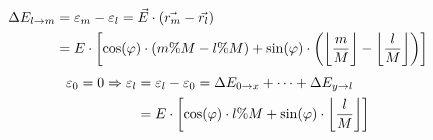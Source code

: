 \begin{equation}
    \label{eq:energy-difference-hopping}
    \begin{split}
        \Delta E_{l \rightarrow m} &=  \epsl[m] - \epsl[l] = \vec{E} \cdot \left(\vec{r_m}-\vec{r_l}\right)\\
        &= E \cdot \left[\cos(\varphi)\cdot \left(m \% M-l \% M\right) + \sin(\varphi)\cdot \left(\floor[\bigg]{\frac{m}{M}}-\floor[\bigg]{\frac{l}{M}}\right)\right]
    \end{split}
\end{equation}
\vspace{0.5cm} %
\begin{equation}
    \label{eq:epsl}
    \begin{split}
        \epsl[0] = 0 \Rightarrow
        \epsl[l] &= \epsl[l] - \epsl[0] = \Delta E_{0 \rightarrow x} + \dots + \Delta E_{y \rightarrow l}\\
        &= E \cdot \left[\cos(\varphi)\cdot l \% M + \sin(\varphi)\cdot \floor[\bigg]{\frac{l}{M}}\right]
    \end{split}
\end{equation}


